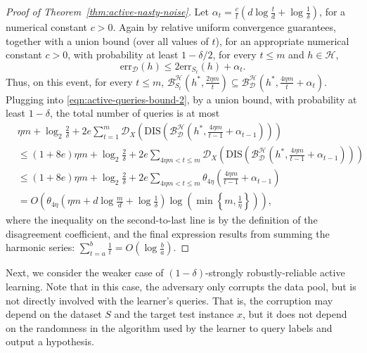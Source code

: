 \documentclass[11pt]{article}
\newcommand{\err}{\mathrm{err}}
\newcommand{\0}{\mathbf{0}}
\newcommand{\1}{\mathbf{1}}
\newcommand{\cB}{\mathcal{B}}
\newcommand{\cD}{\mathcal{D}}
\newcommand{\cH}{\mathcal{H}}
\begin{document}
\begin{proof}[Proof of Theorem~\ref{thm:active-nasty-noise}]
Let $\alpha_{t} = \frac{c}{t}\left( d \log\frac{t}{d} + \log\frac{1}{\delta} \right)$,
for a numerical constant $c > 0$.
Again by relative uniform convergence guarantees,
together with a union bound (over all values of $t$),
for an appropriate numerical constant $c > 0$,
with probability at least $1-\delta/2$,
for every $t \leq m$ and $h \in \cH$,
\begin{equation*}
\err_{\cD}(h) \leq 2 \err_{S_t}(h) + \alpha_{t}.
\end{equation*}
Thus, on this event, for every $t \leq m$,
$\cB_{S_{t}}^\cH\!\left(h^*,\frac{2\eta m}{t}\right) \subseteq \cB_{\cD}^{\cH}\!\left( h^*, \frac{4 \eta m}{t} + \alpha_{t} \right)$.
Plugging into \eqref{eqn:active-queries-bound-2},
by a union bound, with probability at least $1-\delta$,
the total number of queries is at most
\begin{align*}
& \eta m + \log_{2}\frac{2}{\delta} + 2e \sum_{t=1}^{m} \cD_{X}\!\left( \text{DIS}\!\left(\cB_{\cD}^\cH\!\left(h^*,\frac{4\eta m}{t-1}+\alpha_{t-1}\right)\right) \right)
\\ & \leq (1+8e) \eta m + \log_{2}\frac{2}{\delta} + 2e\sum_{4 \eta m < t \leq m} \cD_{X}\!\left( \text{DIS}\!\left(\cB_{\cD}^\cH\!\left(h^*,\frac{4\eta m}{t-1}+\alpha_{t-1}\right)\right) \right)
\\ & \leq (1+8e) \eta m + \log_{2}\frac{2}{\delta} + 2e\sum_{4 \eta m < t \leq m} \theta_{4\eta} \left( \frac{4\eta m}{t-1}+\alpha_{t-1}\right)
\\ & = O\!\left( \theta_{4\eta} \left( \eta m + d \log\frac{m}{d} + \log\frac{1}{\delta} \right) \log\!\left(\min\!\left\{m,\frac{1}{\eta}\right\}\right) \right),
\end{align*}
where the inequality on the second-to-last line is by the definition of the disagreement coefficient,
and the final expression results from summing the harmonic series:
$\sum_{t=a}^{b} \frac{1}{t} = O\!\left( \log \frac{b}{a} \right)$.
\end{proof}


Next, we consider the weaker case of
$(1-\delta)$-strongly robustly-reliable active learning.
Note that in this case, the adversary only corrupts the data pool, but is not directly involved with the learner's queries. That is, the corruption may depend on the dataset $S$ and the target test instance $x$, but it does not depend on the randomness in the algorithm used by the learner to query labels and output a hypothesis.
\end{document}
